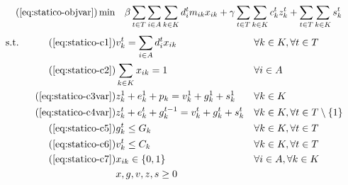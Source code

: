 \begin{align}
    \tag{\ref*{eq:statico-objvar}}
    \min\quad       & \beta \sum_{t \in T} \sum_{i \in A} \sum_{k \in K}{d^t_i m_{ik} x_{ik}} + \gamma \sum_{t \in T} \sum_{k \in K}{c_k^t z_k^t} + \sum_{t \in T} \sum_{k \in K}{s_k^t}
\end{align}
\vspace*{-6mm}
\begin{align}
    \text{s.t.\quad}
    \tag{\ref*{eq:statico-c1}}
    & v_k^t = \sum_{i \in A}{d^t_i x_{ik}}              &   & \forall k \in K, \forall t \in T                 \\
    \tag{\ref*{eq:statico-c2}}
    & \sum_{k \in K}{x_{ik}} = 1                        &   & \forall i \in A                                  \\
    \tag{\ref*{eq:statico-c3var}}
    & z_k^1 + e_k^1 + p_k = v_k^1 + g_k^1 + s_k^1       &   & \forall k \in K                                  \\
    \tag{\ref*{eq:statico-c4var}}
    & z_k^t + e_k^t + g_k^{t-1} = v_k^t + g_k^t + s_k^t &   & \forall k \in K, \forall t \in T \setminus \{1\} \\
    \tag{\ref*{eq:statico-c5}}
    & g_k^t \leq G_k                                    &   & \forall k \in K, \forall t \in T                 \\
    \tag{\ref*{eq:statico-c6}}
    & v_k^t \leq C_k                                    &   & \forall k \in K, \forall t \in T                 \\
    \tag{\ref*{eq:statico-c7}}
    & x_{ik} \in \{0,1\}                                &   & \forall i \in A, \forall k \in K                 \\
    \label{eq:statico-c8}
    & x, g, v, z, s \geq 0                              &   &
\end{align}
